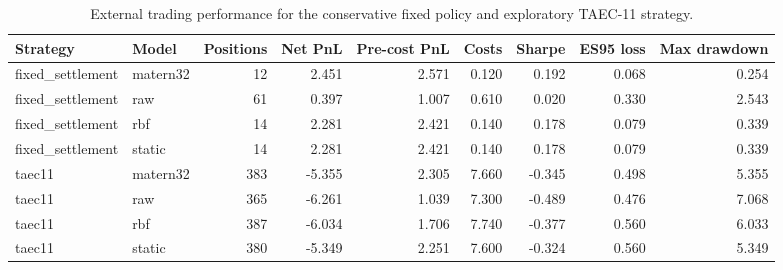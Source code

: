 \begin{table}
\caption{External trading performance for the conservative fixed policy and exploratory TAEC-11 strategy.}
\label{tab:trading-contrast-external}
\begin{tabular}{llrrrrrrr}
\toprule
Strategy & Model & Positions & Net PnL & Pre-cost PnL & Costs & Sharpe & ES95 loss & Max drawdown \\
\midrule
fixed\_settlement & matern32 & 12 & 2.451 & 2.571 & 0.120 & 0.192 & 0.068 & 0.254 \\
fixed\_settlement & raw & 61 & 0.397 & 1.007 & 0.610 & 0.020 & 0.330 & 2.543 \\
fixed\_settlement & rbf & 14 & 2.281 & 2.421 & 0.140 & 0.178 & 0.079 & 0.339 \\
fixed\_settlement & static & 14 & 2.281 & 2.421 & 0.140 & 0.178 & 0.079 & 0.339 \\
taec11 & matern32 & 383 & -5.355 & 2.305 & 7.660 & -0.345 & 0.498 & 5.355 \\
taec11 & raw & 365 & -6.261 & 1.039 & 7.300 & -0.489 & 0.476 & 7.068 \\
taec11 & rbf & 387 & -6.034 & 1.706 & 7.740 & -0.377 & 0.560 & 6.033 \\
taec11 & static & 380 & -5.349 & 2.251 & 7.600 & -0.324 & 0.560 & 5.349 \\
\bottomrule
\end{tabular}
\end{table}
